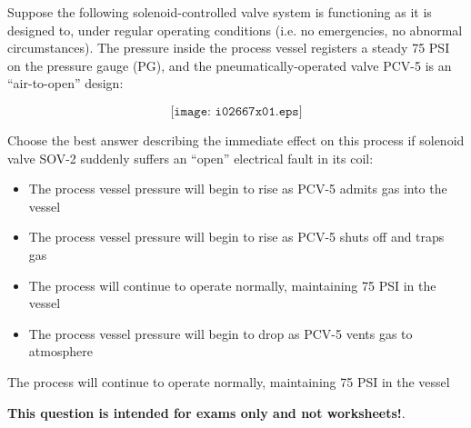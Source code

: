 

Suppose the following solenoid-controlled valve system is functioning as it is designed to, under regular operating conditions (i.e. no emergencies, no abnormal circumstances).  The pressure inside the process vessel registers a steady 75 PSI on the pressure gauge (PG), and the pneumatically-operated valve PCV-5 is an ``air-to-open'' design:

$$\texttt{[image: i02667x01.eps]}$$

\noindent
Choose the best answer describing the immediate effect on this process if solenoid valve SOV-2 suddenly suffers an ``open'' electrical fault in its coil:

\begin{itemize}
\item{} The process vessel pressure will begin to rise as PCV-5 admits gas into the vessel
\vskip 10pt
\item{} The process vessel pressure will begin to rise as PCV-5 shuts off and traps gas
\vskip 10pt
\item{} The process will continue to operate normally, maintaining 75 PSI in the vessel
\vskip 10pt
\item{} The process vessel pressure will begin to drop as PCV-5 vents gas to atmosphere
\end{itemize}







The process will continue to operate normally, maintaining 75 PSI in the vessel







{\bf This question is intended for exams only and not worksheets!}.



